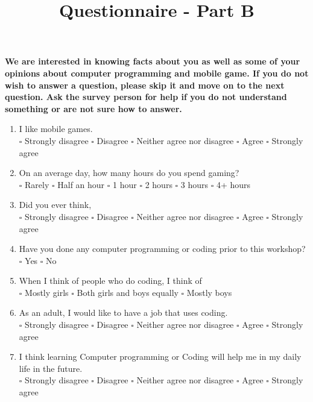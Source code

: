 \documentclass[12pt]{article}\pagestyle{myheadings}
\title{Questionnaire - Part B}
\theoremstyle{plain}
\begin{document}
\begin{mdframed}

\textbf{We are interested in knowing facts about you as well as some of your opinions about
computer programming and mobile game. If you do not wish to answer a question, please skip it and move on to the next question. Ask the survey person for help if you do not understand something or are not sure how
to answer.}

\end{mdframed}
\begin{mdframed}
\begin{enumerate}

\item I like mobile games. \\
$\square$ Strongly disagree $\square$ Disagree $\square$ Neither agree nor disagree $\square$ Agree $\square$ Strongly agree

\item On an average day, how many hours do you spend gaming? \\
$\square$ Rarely $\square$ Half an hour	$\square$ 1 hour $\square$ 2 hours $\square$ 3 hours $\square$	4+ hours

\item Did you ever think,  \\
$\square$ Strongly disagree $\square$ Disagree $\square$ Neither agree nor disagree $\square$ Agree $\square$ Strongly agree

\item Have you done any computer programming or coding prior to this workshop? \\
$\square$ Yes $\square$ No








\item When I think of people who do coding, I think of \\
$\square$ Mostly girls $\square$ Both girls and boys equally $\square$ Mostly boys


\item As an adult, I would like to have a job that uses coding. \\ 
$\square$ Strongly disagree $\square$ Disagree $\square$ Neither agree nor disagree $\square$ Agree $\square$ Strongly agree


\item I think learning Computer programming or Coding will help me in my daily life in the future.\\
$\square$ Strongly disagree $\square$ Disagree $\square$ Neither agree nor disagree $\square$ Agree $\square$ Strongly agree



\end{enumerate}

\end{mdframed}
\end{document}
